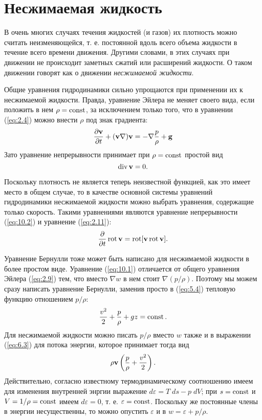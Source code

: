 \section{Несжимаемая жидкость}
\label{sec:p10}

В очень многих случаях течения жидкостей (и газов) их плотность можно считать
неизменяющейся, т. е. постоянной вдоль всего объема жидкости в течение всего
времени движения. Другими словами, в этих случаях при движении не происходит
заметных сжатий или расширений жидкости. О таком движении говорят как о движении
\textit{несжимаемой жидкости}.

Общие уравнения гидродинамики сильно упрощаются при применении их к несжимаемой
жидкости. Правда, уравнение Эйлера не меняет своего вида, если положить в нем
$\rho = \mathop{\mathrm{const}}\nolimits$, за исключением только того, что в уравнении (\ref{eq:2.4}) можно внести
$\rho$ под знак градиента:
\begin{equation}
   \label{eq:10.1}
   \frac{\partial{{ \mathbf{v} }}}{\partial{t}} + ({\mathbf{v}} \nabla) {\mathbf{v}} = - \nabla \frac{p}{\rho} + \mathbf{g}
\end{equation}
Зато уравнение непрерывности принимает при $\rho = \mathop{\mathrm{const}}\nolimits$ простой вид
\begin{equation}
   \label{eq:10.2}
   \mathop{\mathrm{div}}\nolimits { \mathbf{v} } = 0.
\end{equation}

Поскольку плотность не является теперь неизвестной функцией, как это имеет
место в общем случае, то в качестве основной системы уравнений гидродинамики
несжимаемой жидкости можно выбрать уравнения, содержащие только скорость.
Такими уравнениями являются уравнение непрерывности (\ref{eq:10.2}) и уравнение (\ref{eq:2.11}):
\begin{equation}
   \label{eq:10.3}
   \frac{\partial}{\partial t} \mathop{\mathrm{rot}}\nolimits { \mathbf{v} } = \mathop{\mathrm{rot}}\nolimits \lbrack { \mathbf{v} } \mathop{\mathrm{rot}}\nolimits { \mathbf{v} } \rbrack.
\end{equation}

Уравнение Бернулли тоже может быть написано для несжимаемой жидкости в более
простом виде. Уравнение (\ref{eq:10.1}) отличается от общего уравнения Эйлера (\ref{eq:2.9}) тем,
что вместо $\nabla w$ в нем стоит $\nabla(p/\rho)$. Поэтому мы можем сразу
написать уравнение Бернулли, заменив просто в (\ref{eq:5.4}) тепловую функцию
отношением $p/\rho$:
\begin{equation}
   \label{eq:10.4}
   \frac{v^2}{2} + \frac{p}{\rho} + gz = \mathop{\mathrm{const}}\nolimits.
\end{equation}
Для несжимаемой жидкости можно писать $p/\rho$ вместо $w$ также и в выражении
(\ref{eq:6.3}) для потока энергии, которое принимает тогда вид
\begin{equation}
   \label{eq:10.5}
   \rho { \mathbf{v} } \left( \frac{p}{\rho} + \frac{v^2}{2} \right).
\end{equation}
Действительно, согласно известному термодинамическому соотношению имеем для
изменения внутренней энргии выражение $d\varepsilon = T\; ds - p\;dV$; при $s =
\mathop{\mathrm{const}}\nolimits$ и $V=1/\rho = \mathop{\mathrm{const}}\nolimits$ имеем $d\varepsilon=0$, т. е.
$\varepsilon=\mathop{\mathrm{const}}\nolimits$. Поскольку же постоянные члены в энергии несущественны, то
можно опустить $\varepsilon$ и в $w=\varepsilon+p/\rho$.

